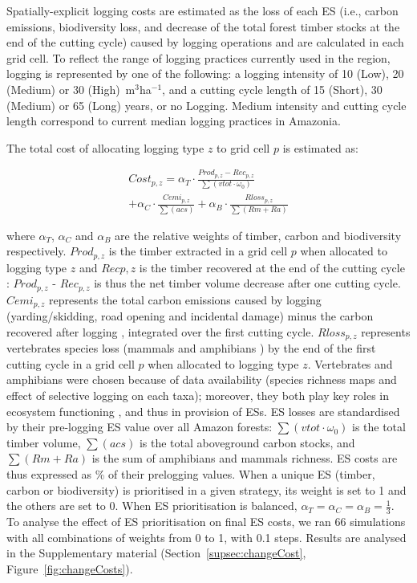 \documentclass{article}
\begin{document}
Spatially-explicit logging costs are estimated as the loss of each ES (i.e., carbon emissions, biodiversity loss, and decrease of the total forest timber stocks at the end of the cutting cycle) caused by logging operations and are calculated in each grid cell. To reflect the range of logging practices currently used in the region, logging is represented by one of the following: a logging intensity of 10 (Low), 20 (Medium) or 30 (High)~m$^3$ha$^{−1}$, and a cutting cycle length of 15 (Short), 30 (Medium) or 65 (Long) years, or no Logging. Medium intensity and cutting cycle length correspond to current median logging practices in Amazonia.

The total cost of allocating logging type $z$ to grid cell $p$ is estimated as: 

\begin{equation}
\begin{split}
    Cost_{p,z} = \alpha _T \cdot \frac{Prod_{p,z} - Rec_{p,z}}{\sum(vtot\cdot \omega_0)} \\+ \alpha _C \cdot \frac{Cemi_{p,z}}{\sum (acs) }  + \alpha _B \cdot \frac{Rloss_{p,z}}{\sum (Rm + Ra)} 
\end{split}
\end{equation}

where $\alpha_T$, $\alpha_C$ and $\alpha_B$ are the relative weights of timber, carbon and biodiversity respectively. $Prod_{p,z}$ is the timber extracted in a grid cell $p$ when allocated to logging type $z$ and $Recp,z$ is the timber recovered at the end of the cutting cycle \cite{Piponiotc}:  $Prod_{p,z}$ - $Rec_{p,z}$ is thus the net timber volume decrease after one cutting cycle. $Cemi_{p,z}$ represents the total carbon emissions caused by logging (yarding/skidding, road opening and incidental damage) minus the carbon recovered after logging \cite{Piponiot2016,Piponiot2016a}, integrated over the first cutting cycle. $Rloss_{p,z}$ represents vertebrates species loss (mammals and amphibians \cite{Jenkins2013}) by the end of the first cutting cycle in a grid cell $p$ when allocated to logging type $z$. Vertebrates and amphibians were chosen because of data availability (species richness maps and effect of selective logging on each taxa); moreover, they both play key roles in ecosystem functioning \cite{Wright2000,Fleming2009,Valencia-Aguilar2013}, and thus in provision of ESs.  
ES losses are standardised by their pre-logging ES value over all Amazon forests: $\sum(vtot\cdot \omega_0)$ is the total timber volume, $\sum (acs)$ is the total aboveground carbon stocks, and $\sum (Rm + Ra)$ is the sum of amphibians and mammals richness. ES costs are thus expressed as \% of their prelogging values. 
When a unique ES (timber, carbon or biodiversity) is prioritised in a given strategy, its weight is set to 1 and the others are set to 0. When ES prioritisation is balanced, $\alpha_T = \alpha_C = \alpha_B = \frac{1}{3}$.
To analyse the effect of ES prioritisation on final ES costs, we ran 66 simulations with all combinations of weights from 0 to 1, with 0.1 steps. Results are analysed in the Supplementary material (Section~\ref{supsec:changeCost}, Figure~\ref{fig:changeCosts}). 
\end{document}

